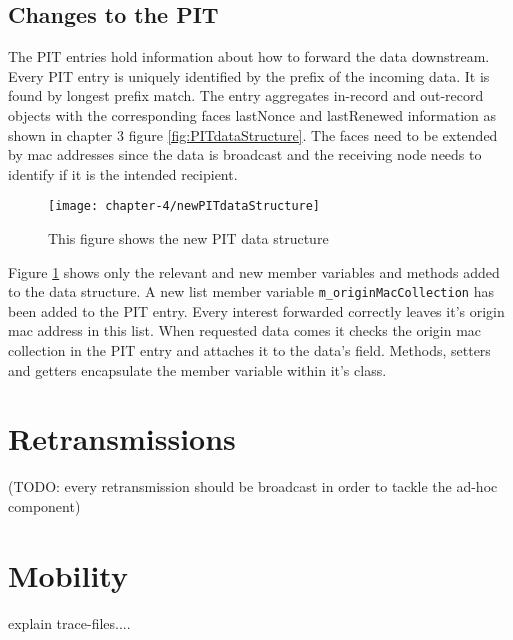 \subsection{Changes to the PIT}

The PIT entries hold information about how to forward the data downstream. Every PIT entry is uniquely identified by the prefix of the incoming data. It is found by longest prefix match. The entry aggregates in-record and out-record objects with the corresponding faces lastNonce and lastRenewed information as shown in chapter 3 figure \ref{fig:PITdataStructure}. The faces need to be extended by mac addresses since the data is broadcast and the receiving node needs to identify if it is the intended recipient.

\begin{figure}[H]
  \centering
  \texttt{[image: chapter-4/newPITdataStructure]}
  \caption{This figure shows the new PIT data structure}
  \label{fig:newPITdataStructure}
\end{figure}

Figure \ref{fig:newPITdataStructure} shows only the relevant and new member variables and methods added to the data structure. A new list member variable \texttt{m\_originMacCollection} has been added to the PIT entry. Every interest forwarded correctly leaves it's origin mac address in this list. When requested data comes it checks the origin mac collection in the PIT entry and attaches it to the data's field. Methods, setters and getters encapsulate the member variable within it's class.

\section{Retransmissions}

(TODO: every retransmission should be broadcast in order to tackle the ad-hoc component)

\section{Mobility}

explain trace-files....
